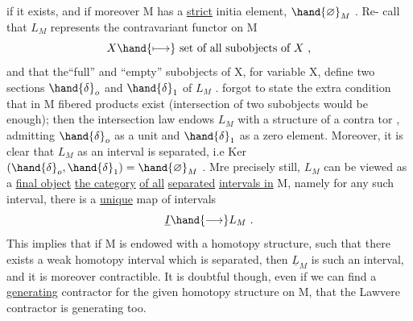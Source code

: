 if it exists,  and if moreover M has a \uline{strict} initia element, $\hand{\varnothing}_{M}$ .  Re-%
call that $L_{M}$  represents the contravariant functor on M
\[ X \hand{\ensuremath{\longmapsto}} \text{ set of all subobjects of } X \text{ ,} \]
and that the``full'' and ``empty'' subobjects of X,  for variable X,  define
two sections $\hand{\ensuremath{\delta}}_{o}$ and $\hand{\ensuremath{\delta}}_{1}$ of $L_{M}$ .   forgot to state the extra condition that
in M fibered products exist (intersection of two subobjects would be
enough);  then the intersection law endows $L_{M}$ with a structure of a contra%
tor , admitting $\hand{\ensuremath{\delta}}_{o}$ as a unit and $\hand{\ensuremath{\delta}}_{1}$ as a zero element.  Moreover,  it is
clear that $L_{M}$ as an interval is separated,  i.e\hand{,} Ker$(\hand{\ensuremath{\delta}}_{o},\hand{\ensuremath{\delta}}_{1}) = \hand{\varnothing}_{M}$ .  Mre
precisely still,  $L_{M}$ can be viewed as a \uline{final object}  \uline{the  category}
\uline{of all} \uline{separated} \uline{intervals in} M,  namely for any such interval,  there is
a \uline{unique} map of intervals
\[ \underline{I} \hand{\ensuremath{\longrightarrow}} L_{M} \text{ .} \]
This implies that if M is endowed with a homotopy structure,  such that
there exists a weak homotopy interval which is separated,  then $\underline{L}_{M}$ is such
an interval,  and it is moreover contractible.  It is doubtful though,
even if we can find a  \uline{generating} contractor for the given homotopy
structure on M,  that the Lawvere contractor is generating too.

